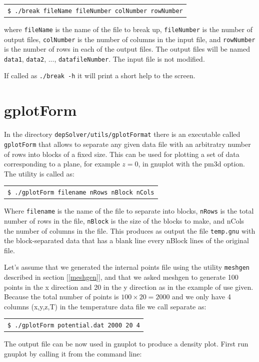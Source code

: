 \documentclass[12pt]{report}
\begin{document}
\begin{tabular}{l}
\texttt{\$ ./break fileName fileNumber colNumber rowNumber}
\end{tabular}

where \verb+fileName+ is the name of the file to break up, \verb+fileNumber+ is the number of output files, \verb+colNumber+ is the number of columns in the input file, and \verb+rowNumber+ is the number of rows in each of the output files. The output files will be named \verb+data1+, \verb+data2+, ..., \verb+datafileNumber+. The input file is not modified.

If called as \verb+./break -h+ it will print a short help to the screen.

\section{gplotForm}
In the directory \verb+depSolver/utils/gplotFormat+ there is an executable called \verb+gplotForm+ that allows to separate any given data file with an arbitratry number of rows into blocks of a fixed size. This can be used for plotting a set of data corresponding to a plane, for example $z=0$, in gnuplot with the pm3d option. The utility is called as:

\begin{tabular}{l}
\texttt{\$ ./gplotForm filename nRows nBlock nCols}
\end{tabular}

Where \verb+filename+ is the name of the file to separate into blocks, \verb+nRows+ is the total number of rows in the file, \verb+nBlock+ is the size of the blocks to make, and nCols the number of columns in the file. This produces as output the file \verb+temp.gnu+ with the block-separated data that has a blank line every nBlock lines of the original file.

Let's assume that we generated the internal points file using the utility \verb+meshgen+ described in section [\ref{meshgen}], and that we asked meshgen to generate 100 points in the x direction and 20 in the y direction as in the example of use given. Because the total number of points is $100\times20=2000$ and we only have 4 columns (x,y,z,T) in the temperature data file we call separate as:

\begin{tabular}{l}
\texttt{\$ ./gplotForm potential.dat 2000 20 4}
\end{tabular}

The output file can be now used in gnuplot to produce a density plot. First run gnuplot by calling it from the command line:
\end{document}
